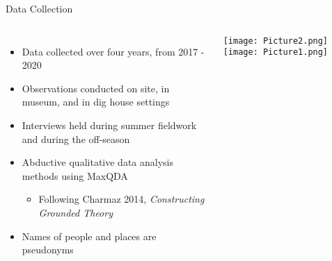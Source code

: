 \documentclass{beamer}
\begin{document}


\begin{frame}{Data Collection}
  \begin{columns}
      \begin{itemize}
        \item Data collected over four years, from 2017 - 2020
        \item Observations conducted on site, in museum, and in dig house settings
        \item Interviews held during summer fieldwork and during the off-season
        \item Abductive qualitative data analysis methods using MaxQDA
        \begin{itemize}
          \item Following Charmaz 2014, \textit{Constructing Grounded Theory}
        \end{itemize}
        \item Names of people and places are pseudonyms
      \end{itemize}

      \centering
      \texttt{[image: Picture2.png]}
        \texttt{[image: Picture1.png]}

\end{columns}
\end{frame}
\end{document}
